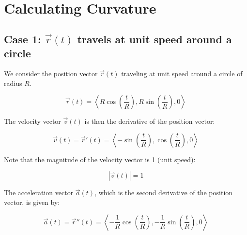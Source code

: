 \documentclass{report}
\begin{document}
\section{Calculating Curvature}

\subsection{Case 1: $\vec{r}(t)$ travels at unit speed around a circle}

We consider the position vector $\vec{r}(t)$ traveling at unit speed around a circle of radius $R$.

\[
	\vec{r}(t) = \left\langle R \cos\left(\frac{t}{R}\right), R \sin\left(\frac{t}{R}\right), 0 \right\rangle
\]

The velocity vector $\vec{v}(t)$ is then the derivative of the position vector:

\[
	\vec{v}(t) = \vec{r}'(t) = \left\langle -\sin\left(\frac{t}{R}\right), \cos\left(\frac{t}{R}\right), 0 \right\rangle
\]

Note that the magnitude of the velocity vector is 1 (unit speed):

\[
	|\vec{v}(t)| = 1
\]

The acceleration vector $\vec{a}(t)$, which is the second derivative of the position vector, is given by:

\[
	\vec{a}(t) = \vec{r}''(t) = \left\langle -\frac{1}{R} \cos\left(\frac{t}{R}\right), -\frac{1}{R} \sin\left(\frac{t}{R}\right), 0 \right\rangle
\]


\begin{center}
\end{center}
\end{document}
